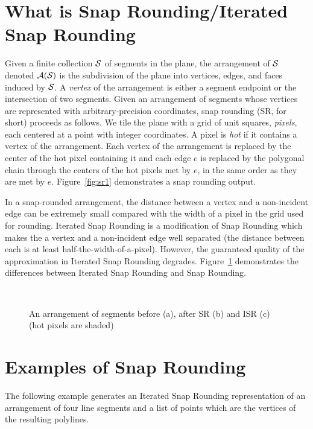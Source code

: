 \section{What is Snap Rounding/Iterated Snap Rounding}
Given a finite collection $\S$ of segments in the plane, the
arrangement of $\S$ denoted $\A(\S)$ is the subdivision of the plane
into vertices, edges, and faces induced by $\S$. %
A {\it vertex\/} of the arrangement is either a segment endpoint or
the intersection of two segments. Given an arrangement of segments
whose vertices are represented with arbitrary-precision coordinates,
snap rounding (SR, for short) proceeds as follows.  We tile the plane
with a grid of unit squares, {\it pixels}, each centered at a point
with integer coordinates. A pixel is {\it hot\/} if it contains a
vertex of the arrangement. Each vertex of the arrangement is replaced
by the center of the hot pixel containing it and each edge $e$ is
replaced by the polygonal chain through the centers of the hot pixels
met by $e$, in the same order as they are met by $e$. 
Figure~\ref{fig:sr1} demonstrates a snap rounding output. 

In a snap-rounded arrangement, the distance between a vertex and
a non-incident edge can be extremely small compared with the width of a
pixel in the grid used for rounding. Iterated Snap Rounding is a modification
of Snap Rounding which makes the a vertex and a non-incident edge well separated
(the distance between each is at least half-the-width-of-a-pixel).
However, the guaranteed quality of the approximation in Iterated Snap Rounding
degrades. Figure~\ref{fig:isr_vs_sr} demonstrates the differences between Iterated
Snap Rounding and Snap Rounding.

\begin{figure}
\begin{center}
\  \
\end{center}
\vspace{-2ex}
\caption{An arrangement of segments before (a), after SR (b)
and ISR (c) (hot pixels are shaded)}
\label{fig:isr_vs_sr}
\end{figure}

\section{Examples of Snap Rounding}

The following example generates an Iterated Snap Rounding representation
of an arrangement of four line segments
and a list of points which are the vertices of the resulting polylines.







